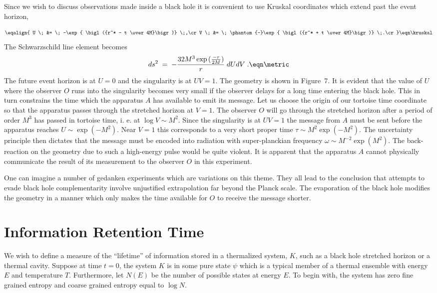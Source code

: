 Since we wish to discuss observations made inside a black hole it is
convenient to use Kruskal coordinates which extend past the event
horizon,

$$\eqalign{
U \; &= \; -\exp{
\bigl({r^* - t \over 4M}\bigr)} \;,\cr
V \; &= \; \phantom{-}\exp{
\bigl({r^* + t \over 4M}\bigr)} \;.\cr}
\eqn\kruskal
$$
The Schwarzschild line element becomes
$$
ds^2 \; = \; - {32M^3\exp{({-r \over 2M})}\over r} \; dUdV \;.
\eqn\metric
$$
The future event horizon is at $U=0$ and the singularity is at
$UV=1$.  The geometry is shown in Figure~7.  It is evident that the
value of $U$ where the observer $O$ runs into the singularity becomes
very small if the observer delays for a long time entering the black
hole.  This in turn constrains the time which the apparatus $A$ has
available to emit its message.  Let us choose the origin of our
tortoise time coordinate so that the apparatus passes through the
stretched horizon at $V=1$.  The observer $O$ will go through the
stretched horizon after a period of order $M^3$ has passed in
tortoise time, i. e. at  $\log{V} \sim M^2$.  Since the singularity
is at $UV=1$ the message from $A$ must be sent before the apparatus
reaches $U \sim \exp{(-M^2)}$.  Near $V=1$ this corresponds to a very
short proper time $\tau \sim M^2 \exp{(-M^2)}$.  The uncertainty
principle then dictates that the message must be encoded into
radiation with super-planckian frequency $\omega \sim
M^{-2}\exp{(M^2)}$.  The back-reaction on the geometry due to such a
high-energy pulse would be quite violent.  It is apparent that the
apparatus $A$ cannot physically communicate the result of its
measurement to the observer $O$ in this experiment.

One can imagine a number of gedanken experiments which are variations
on this theme.  They all lead to the conclusion that attempts to
evade black hole complementarity involve unjustified extrapolation
far beyond the Planck scale.  The evaporation of the black hole
modifies the geometry in a manner which only makes the time available
for $O$ to receive the message shorter.

\chapter{Information Retention Time}

We wish to define a measure of the ``lifetime'' of information stored
in a thermalized system, $K$, such as a black hole stretched horizon
or a thermal cavity.  Suppose at time $t=0$, the system $K$ is in
some pure state $\psi$ which is a typical member of a thermal
ensemble with energy $E$ and temperature $T$.  Furthermore, let
$N(E)$ be the number of possible states at energy $E$.  To begin
with, the system has zero fine grained entropy and coarse grained
entropy equal to $\log{N}$.

